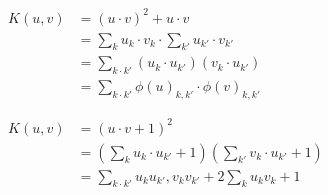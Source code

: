 \documentclass[10pt]{article}
\begin{document}
\begin{align*}K(u,v) & = (u \cdot v)^2 + u \cdot v \\
       & = \sum_k u_k \cdot v_k \cdot \sum_{k'} u_{k'} \cdot v_{k'} \\
       & = \sum_{k \cdot k'} (u_k \cdot u_{k'})(v_k \cdot u_{k'}) \\
       & = \sum_{k \cdot k'} \phi(u)_{k,k'} \cdot \phi(v)_{k,k'}
\\
\\
\\
K(u,v) & = (u \cdot v + 1)^2  \\
       & = (\sum_k u_k \cdot u_{k'} + 1)(\sum_{k'} v_k \cdot u_{k'} + 1) \\
       & = \sum_{k \cdot k'} u_k u_{k'} , v_k v_{k'} + 2\sum_k u_kv_k + 1\end{align*}
\end{document}
